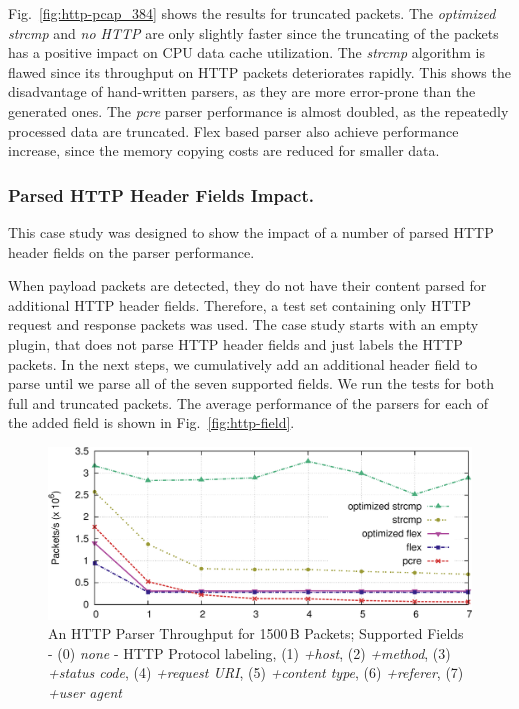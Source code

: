 Fig.~\ref{fig:http-pcap_384} shows the results for truncated packets. The \emph{optimized strcmp} and \emph{no HTTP} are only slightly faster since the truncating of the packets has a positive impact on CPU data cache utilization. The \emph{strcmp} algorithm is flawed since its throughput on HTTP packets deteriorates rapidly. This shows the disadvantage of hand-written parsers, as they are more error-prone than the generated ones. The \emph{pcre} parser performance is almost doubled, as the repeatedly processed data are truncated. Flex based parser also achieve performance increase, since the memory copying costs are reduced for smaller data.

\subsubsection*{Parsed HTTP Header Fields Impact.}

This case study was designed to show the impact of a number of parsed HTTP header fields on the parser performance. 

When payload packets are detected, they do not have their content parsed for additional HTTP header fields. Therefore, a test set containing only HTTP request and response packets was used. The case study starts with an empty plugin, that does not parse HTTP header fields and just labels the HTTP packets. In the next steps, we cumulatively add an additional header field to parse until we parse all of the seven supported fields. We run the tests for both full and truncated packets. The average performance of the parsers for each of the added field is shown in Fig.~\ref{fig:http-field}.

\begin{figure}[htb]
    \centering
    \includegraphics[width=\textwidth]{figures/paper-http/mod_1500}
    \caption{An HTTP Parser Throughput for 1500\,B Packets; Supported Fields - (0) \emph{none} - HTTP Protocol labeling, (1) \emph{+host}, (2) \emph{+method}, (3) \emph{+status code}, (4) \emph{+request URI}, (5) \emph{+content type}, (6) \emph{+referer}, (7) \emph{+user agent}} \label{fig:http-field}
    \label{fig:http-field_1500}
\end{figure}


